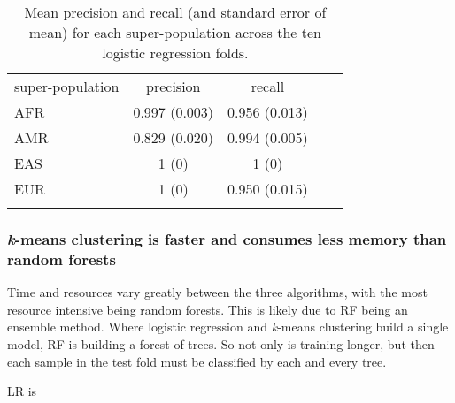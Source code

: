 \documentclass{llncs}
\newcommand{\kMeans}{\textit{k}-means}
\begin{document}
{ 

\begin{table}
\caption{Mean precision and recall (and standard error of mean) for each super-population across the ten logistic regression folds.}
\begin{center}
\renewcommand{\arraystretch}{1.4}
\setlength\tabcolsep{3pt}
\begin{tabular}{lcccc}
\hline\noalign{\smallskip}
super-population  & precision & recall \\
AFR  & 0.997 (0.003) & 0.956 (0.013) \\
AMR & 0.829 (0.020) & 0.994 (0.005) \\
EAS  & 1 (0) & 1 (0) \\
EUR  & 1 (0) & 0.950 (0.015) \\
\noalign{\smallskip}
\hline
\end{tabular}
\end{center}
\end{table}







\subsubsection{\kMeans{} clustering is faster and consumes less memory than random forests}

Time and resources vary greatly between the three algorithms, with the most resource intensive being random forests.
This is likely due to RF being an ensemble method. Where logistic regression and \kMeans{} clustering build a single model,
RF is building a forest of trees. So not only is training longer, but then each sample in the test fold must be classified by each and every tree.

LR is 





}
\end{document}
